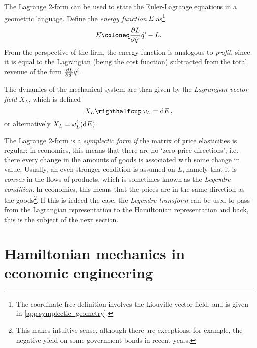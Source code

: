 The Lagrange 2-form can be used to state the Euler-Lagrange equations in a geometric language. Define the \emph{energy function} \(E\) as\footnote{The coordinate-free definition involves the Liouville vector field, and is given in \cref{app:symplectic_geometry}.}
\begin{equation}
    E \coloneq \pdv{L}{\dot{q}^i}\dot{q}^i - L.
\end{equation}
From the perspective of the firm, the energy function is analogous to \emph{profit}, since it is equal to the Lagrangian (being the cost function) subtracted from the total revenue of the firm \(\pdv{L}{\dot{q}^i}\dot{q}^i\).
    
The dynamics of the mechanical system are then given by the \emph{Lagrangian vector field} \(X_L\), which is defined 
\begin{equation}
    \intpr{X_L}{\omega_L} = \dd{E}, 
\end{equation}
or alternatively \(X_L = \omega_L^\sharp(\dd{E})\).

The Lagrange 2-form is a \emph{symplectic form} \emph{if} the matrix of price elasticities is regular: in economics, this means that there are no `zero price directions'; i.e. there every change in the amounts of goods is associated with some change in value. Usually, an even stronger condition is assumed on \(L\), namely that it is \emph{convex} in the flows of products, which is sometimes known as the \emph{Legendre condition}. In economics, this means that the prices are in the same direction as the goods\footnote{This makes intuitive sense, although there are exceptions; for example, the negative yield on some government bonds in recent years.}. If this is indeed the case, the \emph{Legendre transform} can be used to pass from the Lagrangian representation to the Hamiltonian representation and back, this is the subject of the next section. 

\section{Hamiltonian mechanics in economic engineering}
